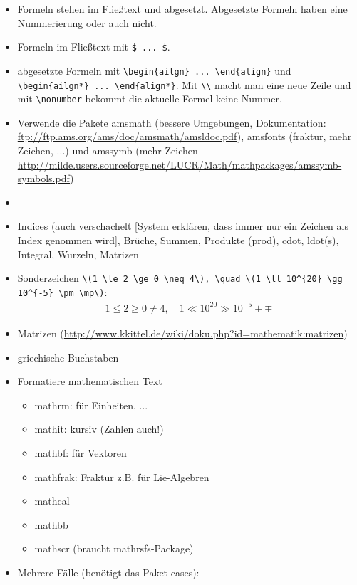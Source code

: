 \documentclass[11pt,a4paper]{scrartcl}
\begin{document}
\begin{itemize}
\item Formeln stehen im Fließtext und abgesetzt. Abgesetzte Formeln haben eine Nummerierung oder auch nicht.
\item Formeln im Fließtext mit \verb|$ ... $|.
\item abgesetzte Formeln mit \verb|\begin{ailgn} ... \end{align}| und \verb|\begin{ailgn*} ... \end{align*}|. Mit \verb|\\| macht man eine neue Zeile und mit \verb|\nonumber| bekommt die aktuelle Formel keine Nummer.
\item Verwende die Pakete amsmath (bessere Umgebungen, Dokumentation: \url{ftp://ftp.ams.org/ams/doc/amsmath/amsldoc.pdf}), amsfonts (fraktur, mehr Zeichen, ...) und amssymb (mehr Zeichen \url{http://milde.users.sourceforge.net/LUCR/Math/mathpackages/amssymb-symbols.pdf})
\item 
\item Indices (auch verschachelt [System erklären, dass immer nur ein Zeichen als Index genommen wird], Brüche, Summen, Produkte (prod), cdot, ldot(s), Integral, Wurzeln, Matrizen
\item Sonderzeichen \verb|\(1 \le 2 \ge 0 \neq 4\), \quad \(1 \ll 10^{20} \gg 10^{-5} \pm \mp\)|:
  \begin{align*}
  1 \le 2 \ge 0 \neq 4, \quad 1 \ll 10^{20} \gg 10^{-5} \pm \mp
  \end{align*}
\item Matrizen (\url{http://www.kkittel.de/wiki/doku.php?id=mathematik:matrizen})
\item griechische Buchstaben
\item Formatiere mathematischen Text
  \begin{itemize}
  \item mathrm: für Einheiten, ...
  \item mathit: kursiv (Zahlen auch!)
  \item mathbf: für Vektoren
  \item mathfrak: Fraktur z.B. für Lie-Algebren
  \item mathcal
  \item mathbb
  \item mathscr (braucht mathrsfs-Package)
  \end{itemize}
\item Mehrere Fälle (benötigt das Paket cases):

\end{itemize}
\end{document}

